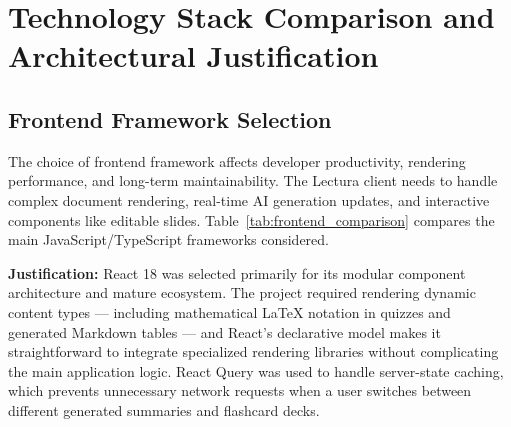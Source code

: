 \chapter{Technology Stack Comparison and Architectural Justification}
\label{chap:tech_justification}

\section{Frontend Framework Selection}
The choice of frontend framework affects developer productivity, rendering performance, and long-term maintainability. The Lectura client needs to handle complex document rendering, real-time AI generation updates, and interactive components like editable slides. Table~\ref{tab:frontend_comparison} compares the main JavaScript/TypeScript frameworks considered.

\begin{table}[htbp]
\centering
{}
\vspace{6pt}
\caption{Comparison of frontend SPA frameworks.}
\label{tab:frontend_comparison}
\end{table}

\textbf{Justification:} React 18 was selected primarily for its modular component architecture and mature ecosystem. The project required rendering dynamic content types — including mathematical LaTeX notation in quizzes and generated Markdown tables — and React's declarative model makes it straightforward to integrate specialized rendering libraries without complicating the main application logic. React Query was used to handle server-state caching, which prevents unnecessary network requests when a user switches between different generated summaries and flashcard decks.

